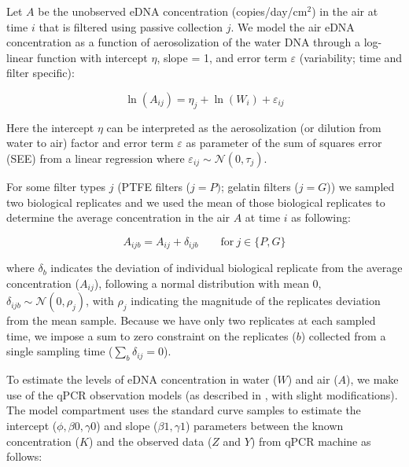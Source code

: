 \documentclass{article}
\begin{document}
Let $A$ be the unobserved eDNA concentration (copies/day/cm$^2$) in the air at time $i$ that is filtered using passive collection $j$. We model the air eDNA concentration as a function of aerosolization of the water DNA through a log-linear function with intercept $\eta$, slope = 1, and error term $\varepsilon$ (variability; time and filter specific):

\begin{equation}
\ln(A_{ij}) = \eta_{j} + \ln(W_{i}) + \varepsilon_{ij}
\end{equation}

Here the intercept $\eta$ can be interpreted as the aerosolization (or dilution from water to air) factor and error term $\varepsilon$ as parameter of the sum of squares error (SEE) from a linear regression where $\varepsilon_{ij} \sim \mathcal{N}(0,\tau_j)$.

For some filter types $j$ (PTFE filters (${j=P})$; gelatin filters (${j=G}$)) we sampled two biological replicates and we used the mean of those biological replicates to determine the average concentration in the air $A$ at time $i$ as following:

\begin{equation}
A_{ijb} = A_{ij} + \delta_{ijb} \qquad \text{for} \ j \in \{P,G\}
\end{equation}


where $\delta_b$ indicates the deviation of individual biological replicate from the average concentration ($A_{ij}$), following a normal distribution with mean 0, $\delta_{ijb} \sim \mathcal{N}(0,\rho_j)$, with $\rho_j$ indicating the magnitude of the replicates deviation from the mean sample. Because we have only two replicates at each sampled time, we impose a sum to zero constraint on the replicates ($b$) collected from a single sampling time ($\sum_b \delta_{ij} = 0$).

To estimate the levels of eDNA concentration in water ($W$) and air ($A$), we make use of the qPCR observation models (as described in \cite{guri2024, shelton2022}, with slight modifications). The model compartment uses the standard curve samples to estimate the intercept ($\phi,\beta0,\gamma0$) and slope ($\beta1, \gamma1$) parameters between the known concentration ($K$) and the observed data ($Z$ and $Y$) from qPCR machine as follows:
\end{document}
